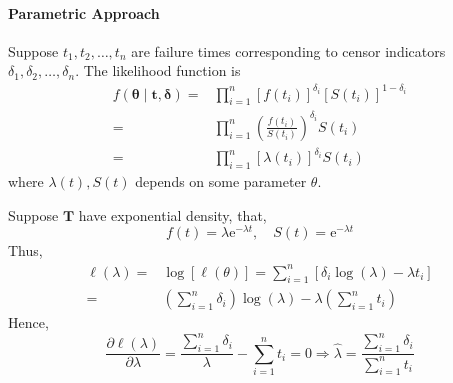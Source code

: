 \paragraph*{Parametric Approach}

Suppose $t_{1},t_{2},\ldots,t_{n}$ are failure times corresponding to censor indicators $\delta_{1},\delta_{2},\ldots,\delta_{n}$. The likelihood function is
\begin{equation}
    \begin{aligned}
        f\left(\boldsymbol{\theta}\mid\mathbf{t},\boldsymbol{\delta}\right)= & \prod_{i=1}^{n}\left[f\left(t_{i}\right)\right]^{\delta_{i}}\left[S\left(t_{i}\right)\right]^{1-\delta_{i}} \\
        =                                                                    & \prod_{i=1}^{n}\left(\frac{f\left(t_{i}\right)}{S\left(t_{i}\right)}\right)^{\delta_{i}}S\left(t_{i}\right) \\
        =                                                                    & \prod_{i=1}^{n}\left[\lambda\left(t_{i}\right)\right]^{\delta_{i}}S\left(t_{i}\right)
    \end{aligned}
\end{equation}
where $\lambda(t),S(t)$ depends on some parameter $\theta$.

\begin{example}
    Suppose $\boldsymbol{T}$ have exponential density, that,
    \begin{equation*}
        f(t)=\lambda \mathrm{e}^{-\lambda t},\quad S(t)=\mathrm{e}^{-\lambda t}
    \end{equation*}
    Thus,
    \begin{equation*}
        \begin{aligned}
            \ell(\lambda)= & \log[\ell(\theta)]=\sum_{i=1}^{n}\left[\delta_{i}\log(\lambda)-\lambda t_{i}\right]        \\
            =              & \left(\sum_{i=1}^{n}\delta_{i}\right)\log(\lambda)-\lambda\left(\sum_{i=1}^{n}t_{i}\right)
        \end{aligned}
    \end{equation*}
    Hence,
    \begin{equation*}
        \frac{\partial\ell(\lambda)}{\partial\lambda}=\frac{\sum_{i=1}^{n}\delta_{i}}{\lambda}-\sum_{i=1}^{n}t_{i}=0\Rightarrow\hat{\lambda}=\frac{\sum_{i=1}^{n}\delta_{i}}{\sum_{i=1}^{n}t_{i}}
    \end{equation*}
\end{example}

